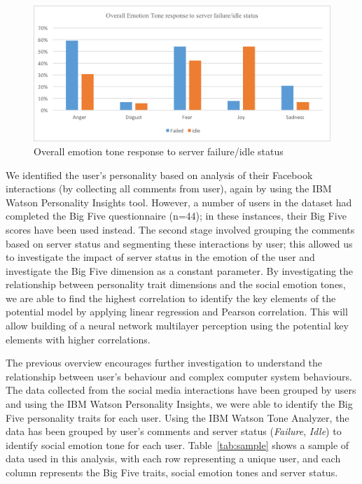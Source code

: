\documentclass[graybox]{svmult}
\begin{document}
{\begin{figure}[!ht]
\centering
\includegraphics[width=\columnwidth]{images/emotiontone}
\caption{Overall emotion tone response to server failure/idle status}
\label{fig:emotiontone} 
\end{figure}

We identified the user's personality based on analysis of their
Facebook interactions (by collecting all comments from user), again by
using the IBM Watson Personality Insights tool. However,
a number of users in the dataset had completed the Big Five
questionnaire (n=44); in these instances, their Big Five scores have
been used instead. The second stage involved grouping the comments
based on server status and segmenting these interactions by user; this
allowed us to investigate the impact of server status in the emotion
of the user and investigate the Big Five dimension as a constant
parameter. By investigating the relationship between personality trait
dimensions and the social emotion tones, we are able to find the
highest correlation to identify the key elements of the potential
model by applying linear regression and Pearson correlation. This will
allow building of a neural network multilayer perception using the
potential key elements with higher correlations.

The previous overview encourages further investigation to understand
the relationship between user's behaviour and complex computer system
behaviours. The data collected from the social media interactions have
been grouped by users and using the IBM Watson Personality Insights,
we were able to identify the Big Five personality traits for each
user. Using the IBM Watson Tone Analyzer, the data has been grouped by
user's comments and server status ({\emph{Failure}}, {\emph{Idle}}) to
identify social emotion tone for each user. Table~\ref{tab:sample}
shows a sample of data used in this analysis, with each row
representing a unique user, and each column represents the Big Five
traits, social emotion tones and server status.

}
\end{document}
